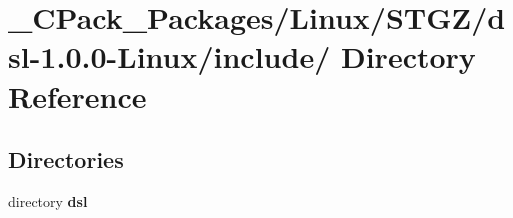 \section{\_\-CPack\_\-Packages/Linux/STGZ/dsl-\/1.0.0-\/Linux/include/ Directory Reference}
\label{dir_3bd05a077d6494803f21c4bb09b76c20}
\subsection*{Directories}
\begin{DoxyCompactItemize}
\item 
directory {\bf dsl}
\end{DoxyCompactItemize}
